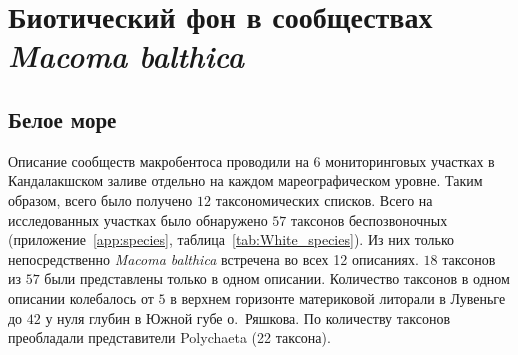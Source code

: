 		\chapter{Биотический фон в сообществах {\it Macoma balthica}}

	\section{Белое море}
Описание сообществ макробентоса проводили на 6 мониторинговых участках в Кандалакшском заливе отдельно на каждом мареографическом уровне. 
Таким образом, всего было получено $12$ таксономических списков.
Всего на  исследованных участках было обнаружено $57$ таксонов беспозвоночных (приложение~\ref{app:species}, таблица~\ref{tab:White_species}).
Из них только непосредственно {\it Macoma balthica} встречена во всех 12 описаниях.
$18$ таксонов из $57$ были представлены только в одном описании.
Количество таксонов в одном описании колебалось от $5$ в верхнем горизонте материковой литорали в Лувеньге до $42$ у нуля глубин в Южной губе о.~Ряшкова.
По количеству таксонов преобладали представители Polychaeta (22 таксона).


